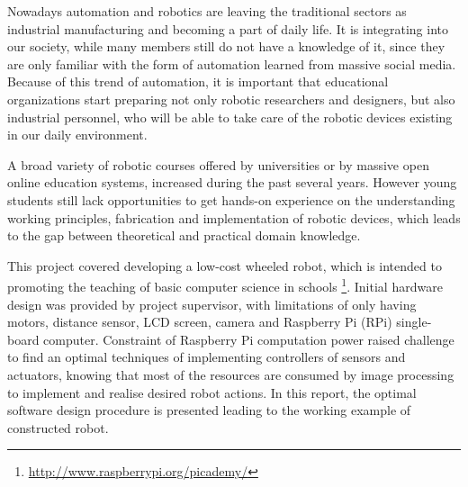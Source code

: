Nowadays automation and robotics are leaving the traditional sectors as industrial manufacturing and becoming a part of daily life. It is integrating into our society, while many members still do not have a knowledge of it, since they are only familiar with the form of automation learned from massive social media.
Because of this trend of automation, it is important that educational organizations start preparing not only robotic researchers and designers, but also industrial personnel, who will be able
to take care of the robotic devices existing in our daily environment. 

A broad variety of robotic courses offered by universities or by massive open online education systems, increased during the past several years. However young students still lack opportunities to get hands-on experience on the understanding working principles, fabrication and implementation of robotic devices, which leads to the gap between theoretical and practical domain knowledge.

This project covered developing a low-cost wheeled robot, which is intended to promoting the teaching of basic computer science in schools \footnote{\url{http://www.raspberrypi.org/picademy/}}. Initial hardware design was provided by project supervisor, with limitations of only having motors, distance sensor, LCD screen, camera and Raspberry Pi (RPi) single-board computer.
Constraint of  Raspberry Pi computation power raised challenge to find an  optimal techniques of implementing controllers of sensors and actuators, knowing that most of the resources are consumed by image processing to implement and realise desired robot actions. In this report, the optimal software design procedure is presented leading to the working example of constructed robot.
